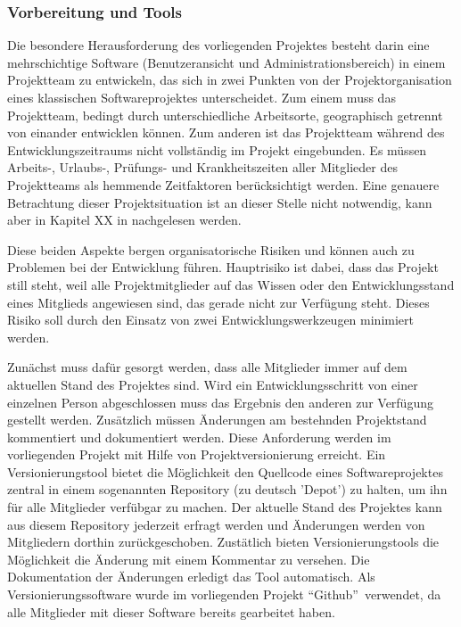 \subsubsection{Vorbereitung und Tools}
\label{sec:VorbereitungUndTools}

Die besondere Herausforderung des vorliegenden Projektes besteht darin eine mehrschichtige Software (Benutzeransicht und Administrationsbereich) in einem Projektteam zu entwickeln, das sich in zwei Punkten von der Projektorganisation eines klassischen Softwareprojektes unterscheidet. Zum einem muss das Projektteam, bedingt durch unterschiedliche Arbeitsorte, geographisch getrennt von einander entwicklen können. Zum anderen ist das Projektteam während des Entwicklungszeitraums nicht vollständig im Projekt eingebunden. Es müssen Arbeits-, Urlaubs-, Prüfungs- und Krankheitszeiten aller Mitglieder des Projektteams als hemmende Zeitfaktoren berücksichtigt werden. Eine genauere Betrachtung dieser Projektsituation ist an dieser Stelle nicht notwendig, kann aber in Kapitel XX in \citet{unternehmensfuehrung2014} nachgelesen werden.


Diese beiden Aspekte bergen organisatorische Risiken und können auch zu Problemen bei der Entwicklung führen. Hauptrisiko ist dabei, dass das Projekt still steht, weil alle Projektmitglieder auf das Wissen oder den Entwicklungsstand eines Mitglieds angewiesen sind, das gerade nicht zur Verfügung steht. Dieses Risiko soll durch den Einsatz von zwei Entwicklungswerkzeugen minimiert werden.

Zunächst muss dafür gesorgt werden, dass alle Mitglieder immer auf dem aktuellen Stand des Projektes sind. Wird ein Entwicklungsschritt von einer einzelnen Person abgeschlossen muss das Ergebnis den anderen zur Verfügung gestellt werden. Zusätzlich müssen Änderungen am bestehnden Projektstand kommentiert und dokumentiert werden. Diese Anforderung werden im vorliegenden Projekt mit Hilfe von Projektversionierung erreicht. Ein Versionierungstool bietet die Möglichkeit den Quellcode eines Softwareprojektes zentral in einem sogenannten Repository (zu deutsch 'Depot') zu halten, um ihn für alle Mitglieder verfübgar zu machen. Der aktuelle Stand des Projektes kann aus diesem Repository jederzeit erfragt werden und Änderungen werden von Mitgliedern dorthin zurückgeschoben. Zustätlich bieten Versionierungstools die Möglichkeit die Änderung mit einem Kommentar zu versehen. Die Dokumentation der Änderungen erledigt das Tool automatisch. Als Versionierungssoftware wurde im vorliegenden Projekt "`Github"'\footnotemark\ verwendet, da alle Mitglieder mit dieser Software bereits gearbeitet haben.

